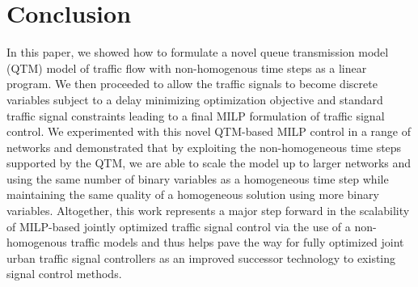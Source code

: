 \section{Conclusion}

In this paper, we showed how to formulate a novel queue transmission
model (QTM) model of traffic flow with non-homogenous time steps as a
linear program.  We then proceeded to allow the traffic signals to
become discrete variables subject to a delay minimizing optimization
objective and standard traffic signal constraints leading to a final
MILP formulation of traffic signal control.  We experimented with this
novel QTM-based MILP control in a range of networks and demonstrated
that by exploiting the non-homogeneous time steps supported by the
QTM, we are able to scale the model up to larger networks and using
the same number of binary variables as a homogeneous time step while
maintaining the same quality of a homogeneous solution using more
binary variables.  Altogether, this work represents a major step
forward in the scalability of MILP-based jointly optimized traffic
signal control via the use of a non-homogenous traffic models and thus
helps pave the way for fully optimized joint urban traffic signal
controllers as an improved successor technology to existing signal
control methods.

